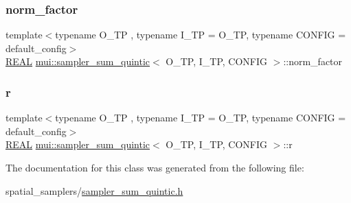 \subsubsection{\texorpdfstring{norm\+\_\+factor}{norm\_factor}}
{\footnotesize\ttfamily template$<$typename O\+\_\+\+TP , typename I\+\_\+\+TP  = O\+\_\+\+TP, typename C\+O\+N\+F\+IG  = default\+\_\+config$>$ \\
\hyperlink{classmui_1_1sampler__sum__quintic_a9cbbc0e8f2384abe39ec2339229b64b6}{R\+E\+AL} \hyperlink{classmui_1_1sampler__sum__quintic}{mui\+::sampler\+\_\+sum\+\_\+quintic}$<$ O\+\_\+\+TP, I\+\_\+\+TP, C\+O\+N\+F\+IG $>$\+::norm\+\_\+factor\hspace{0.3cm}{\ttfamily [protected]}}

\mbox{\label{classmui_1_1sampler__sum__quintic_a6e3b95f28e5e487bfac148b6b3ba8c4e}} 
\subsubsection{\texorpdfstring{r}{r}}
{\footnotesize\ttfamily template$<$typename O\+\_\+\+TP , typename I\+\_\+\+TP  = O\+\_\+\+TP, typename C\+O\+N\+F\+IG  = default\+\_\+config$>$ \\
\hyperlink{classmui_1_1sampler__sum__quintic_a9cbbc0e8f2384abe39ec2339229b64b6}{R\+E\+AL} \hyperlink{classmui_1_1sampler__sum__quintic}{mui\+::sampler\+\_\+sum\+\_\+quintic}$<$ O\+\_\+\+TP, I\+\_\+\+TP, C\+O\+N\+F\+IG $>$\+::r\hspace{0.3cm}{\ttfamily [protected]}}



The documentation for this class was generated from the following file\+:\begin{DoxyCompactItemize}
\item 
spatial\+\_\+samplers/\hyperlink{sampler__sum__quintic_8h}{sampler\+\_\+sum\+\_\+quintic.\+h}\end{DoxyCompactItemize}
